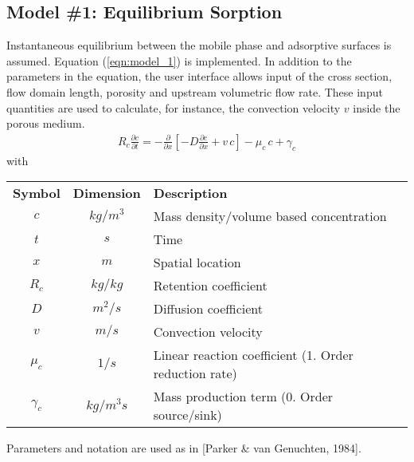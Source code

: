 \documentclass[a4paper,fleqn,11pt]{article}
\numberwithin{equation}{section}
\newcommand{\eqn}[1]{(\ref{#1})}
\begin{document}
\subsection{Model \#1: Equilibrium Sorption}
Instantaneous equilibrium between the mobile phase and adsorptive surfaces is assumed. Equation \eqn{eqn:model_1} is implemented. In addition to the parameters in the equation, the user interface allows input of the cross section, flow domain length, porosity and upstream volumetric flow rate. These input quantities are used to calculate, for instance, the convection velocity $v$ inside the porous medium.
\begin{align}\label{eqn:model_1}
R_c \frac{\partial c}{\partial t} = -\frac{\partial }{\partial x}\left[ - D\frac{\partial c}{\partial x} + v\,c \right] - \mu_c\,c + \gamma_c
\end{align}
with
\begin{center}
 \footnotesize
\begin{tabular}{ccl}
  \textbf{Symbol} & \textbf{Dimension} & \textbf{Description} \\[1mm]
  $c$ & $kg/m^3$ & Mass density/volume based concentration \\
  $t$ & $s$ & Time \\
  $x$ & $m$ & Spatial location \\
  $R_c$ & $kg/kg$ & Retention coefficient \\
  $D$ & $m^2/s$ & Diffusion coefficient \\
  $v$ & $m/s$ & Convection velocity \\
  $\mu_c$ & $1/s$ & Linear reaction coefficient (1. Order reduction rate) \\
  $\gamma_c$ & $kg/m^3s$ & Mass production term (0. Order source/sink) \\
\end{tabular}
\end{center}
Parameters and notation are used as in [Parker \& van Genuchten, 1984].
\end{document}
